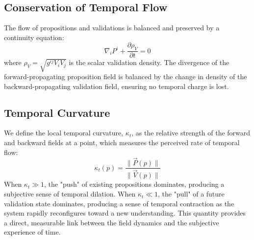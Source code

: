 
\subsection{Conservation of Temporal Flow}
\label{sec:conservation_of_temporal_flow}

The flow of propositions and validations is balanced and preserved by a continuity equation:
\begin{equation}
\nabla_i P^i + \frac{\partial \rho_V}{\partial t} = 0
\end{equation}
where \(\rho_V = \sqrt{g^{ij} V_{i} V_{j}}\) is the scalar validation density. The divergence of the forward-propagating proposition field is balanced by the change in density of the backward-propagating validation field, ensuring no temporal charge is lost.


\subsection{Temporal Curvature}
\label{sec:temporal_curvature}

We define the local temporal curvature, \(\kappa_t\), as the relative strength of the forward and backward fields at a point, which measures the perceived rate of temporal flow:
\begin{equation}
\kappa_t(p) = \frac{\|\vec{P}(p)\|}{\|\vec{V}(p)\|}
\end{equation}
When \(\kappa_t \gg 1\), the "push" of existing propositions dominates, producing a subjective sense of temporal dilation. When \(\kappa_t \ll 1\), the "pull" of a future validation state dominates, producing a sense of temporal contraction as the system rapidly reconfigures toward a new understanding. This quantity provides a direct, measurable link between the field dynamics and the subjective experience of time. 